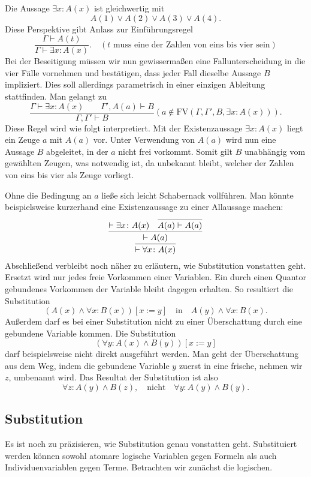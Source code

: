 Die Aussage $\exists x\colon A(x)$ ist gleichwertig mit
\[A(1)\lor A(2)\lor A(3)\lor A(4).\]
Diese Perspektive gibt Anlass zur Einführungsregel
\[\dfrac{\Gamma\vdash A(t)}{\Gamma\vdash\exists x\colon A(x)}.\quad
(\text{$t$ muss eine der Zahlen von eins bis vier sein})\]
Bei der Beseitigung müssen wir nun gewissermaßen eine Fallunterscheidung
in die vier Fälle vornehmen und bestätigen, dass jeder Fall dieselbe
Aussage $B$ impliziert. Dies soll allerdings parametrisch in einer
einzigen Ableitung stattfinden. Man gelangt zu
\[\dfrac{\Gamma\vdash\exists x\colon A(x)\qquad\Gamma',A(a)\vdash B}
{\Gamma,\Gamma'\vdash B}(a\notin\mathrm{FV}(\Gamma,\Gamma',B,\exists x\colon A(x))).\]
Diese Regel wird wie folgt interpretiert. Mit der Existenzaussage
$\exists x\colon A(x)$ liegt ein Zeuge $a$ mit $A(a)$ vor. Unter
Verwendung von $A(a)$ wird nun eine Aussage $B$ abgeleitet, in der $a$
nicht frei vorkommt. Somit gilt $B$ unabhängig vom gewählten Zeugen,
was notwendig ist, da unbekannt bleibt, welcher der Zahlen von eins
bis vier als Zeuge vorliegt.

Ohne die Bedingung an $a$ ließe sich leicht Schabernack vollführen.
Man könnte beispielsweise kurzerhand eine Existenzaussage zu einer
Allaussage machen:
\[\infer{\vdash\forall x\colon A(x)}{
  \infer{\vdash A(a)}{
    \vdash \exists x\colon A(x)
  & \infer{A(a)\vdash A(a)}{}}}\]
Abschließend verbleibt noch näher zu erläutern, wie Substitution
vonstatten geht. Ersetzt wird nur jedes freie Vorkommen einer
Variablen. Ein durch einen Quantor gebundenes Vorkommen der Variable
bleibt dagegen erhalten. So resultiert die Substitution
\[(A(x)\land\forall x: B(x))[x:=y]\quad\text{in}\quad
A(y)\land\forall x\colon B(x).\]
Außerdem darf es bei einer Substitution nicht zu einer Überschattung
durch eine gebundene Variable kommen. Die Substitution
\[(\forall y\colon A(x)\land B(y))[x:=y]\]
darf beispielsweise nicht direkt ausgeführt werden. Man geht der
Überschattung aus dem Weg, indem die gebundene Variable $y$ zuerst
in eine frische, nehmen wir $z$, umbenannt wird. Das Resultat der
Substitution ist also
\[\forall z\colon A(y)\land B(z),\quad\text{nicht}\quad
\forall y\colon A(y)\land B(y).\]

\subsection{Substitution}

Es ist noch zu präzisieren, wie Substitution genau vonstatten geht.
Substituiert werden können sowohl atomare logische Variablen gegen
Formeln als auch Individuenvariablen gegen Terme. Betrachten wir
zunächst die logischen.


